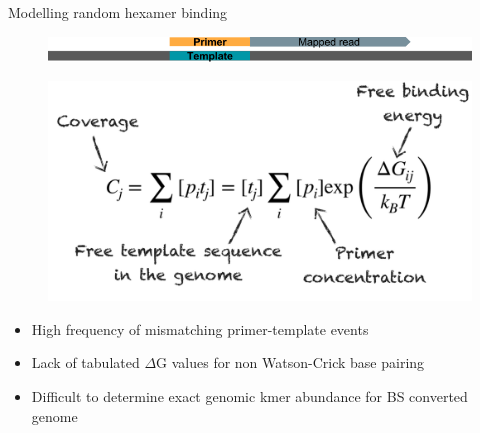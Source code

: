 \documentclass[10pt]{beamer}
\newcommand\Wider[2][3em]{%
\makebox[\linewidth][c]{%
  \begin{minipage}{\dimexpr\textwidth+#1\relax}
  \raggedright#2
  \end{minipage}%
  }%
}
\begin{document}
\begin{frame}[label=current]{Modelling random hexamer binding}
  \vspace{-2cm}
  \begin{figure}
      \centering
      \includegraphics[scale=0.25, trim={0 3cm 0 8cm}, clip]{template_primer.png}
  \end{figure}
\begin{figure}
  \includegraphics[scale=0.3]{model_w_labels.png}
\end{figure}
\begin{itemize}
  \item High frequency of mismatching primer-template events
  \item Lack of tabulated $\Delta$G values for non Watson-Crick base pairing
  \item Difficult to determine exact genomic kmer abundance for BS converted genome
\end{itemize}
\end{frame}
%
%
\end{document}
